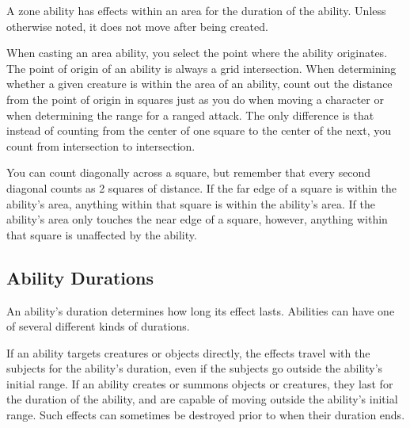        A zone ability has effects within an area for the duration of the ability.
      Unless otherwise noted, it does not move after being created.

      When casting an area ability, you select the point where the ability originates.
      The point of origin of an ability is always a grid intersection.
      When determining whether a given creature is within the area of an ability, count out the distance from the point of origin in squares just as you do when moving a character or when determining the range for a ranged attack.
      The only difference is that instead of counting from the center of one square to the center of the next, you count from intersection to intersection.


      You can count diagonally across a square, but remember that every second diagonal counts as 2 squares of distance.
      If the far edge of a square is within the ability's area, anything within that square is within the ability's area.
      If the ability's area only touches the near edge of a square, however, anything within that square is unaffected by the ability.

  \subsection{Ability Durations}\label{Ability Durations}

    An ability's duration determines how long its effect lasts.
    Abilities can have one of several different kinds of durations.

    If an ability targets creatures or objects directly, the effects travel with the subjects for the ability's duration, even if the subjects go outside the ability's initial range.
    If an ability creates or summons objects or creatures, they last for the duration of the ability, and are capable of moving outside the ability's initial range.
    Such effects can sometimes be destroyed prior to when their duration ends.

